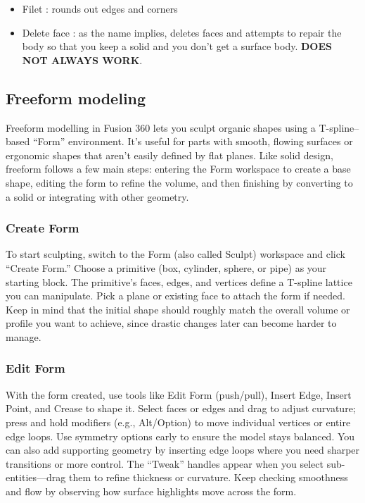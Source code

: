 \begin{itemize}
    \item Filet : rounds out edges and corners
    \item Delete face : as the name implies, deletes faces and attempts to repair the body so that you keep a solid and you don’t get a surface body. \textbf{DOES NOT ALWAYS WORK}. 
\end{itemize}

\subsection{Freeform modeling}

Freeform modelling in Fusion 360 lets you sculpt organic shapes using a T-spline–based “Form” environment. It’s useful for parts with smooth, flowing surfaces or ergonomic shapes that aren’t easily defined by flat planes. Like solid design, freeform follows a few main steps: entering the Form workspace to create a base shape, editing the form to refine the volume, and then finishing by converting to a solid or integrating with other geometry.

\subsubsection{Create Form}
To start sculpting, switch to the Form (also called Sculpt) workspace and click “Create Form.” Choose a primitive (box, cylinder, sphere, or pipe) as your starting block. The primitive’s faces, edges, and vertices define a T-spline lattice you can manipulate. Pick a plane or existing face to attach the form if needed. Keep in mind that the initial shape should roughly match the overall volume or profile you want to achieve, since drastic changes later can become harder to manage.

\subsubsection{Edit Form}
With the form created, use tools like Edit Form (push/pull), Insert Edge, Insert Point, and Crease to shape it. Select faces or edges and drag to adjust curvature; press and hold modifiers (e.g., Alt/Option) to move individual vertices or entire edge loops. Use symmetry options early to ensure the model stays balanced. You can also add supporting geometry by inserting edge loops where you need sharper transitions or more control. The “Tweak” handles appear when you select sub-entities—drag them to refine thickness or curvature. Keep checking smoothness and flow by observing how surface highlights move across the form.

